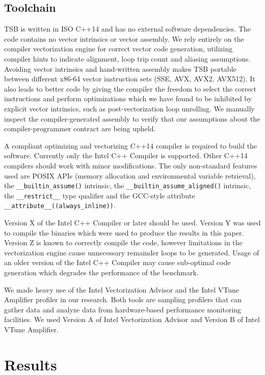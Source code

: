 \documentclass[conference]{IEEEtran}
\begin{document}
\subsection{Toolchain}

TSB is written in ISO C++14 and has no external software dependencies. The code
contains no vector intrinsics or vector assembly. We rely entirely on the
compiler vectorization engine for correct vector code generation, utilizing
compiler hints to indicate alignment, loop trip count and aliasing assumptions.
Avoiding vector intrinsics and hand-written assembly makes TSB portable between
different x86-64 vector instruction sets (SSE, AVX, AVX2, AVX512). It also
leads to better code by giving the compiler the freedom to select the correct
instructions and perform optimizations which we have found to be inhibited by
explicit vector intrinsics, such as post-vectorization loop unrolling. We
manually inspect the compiler-generated assembly to verify that our assumptions
about the compiler-programmer contract are being upheld.

A compliant optimizing and vectorizing C++14 compiler is required to build the
software. Currently only the Intel C++ Compiler is supported. Other C++14
compilers should work with minor modifications. The only non-standard features
used are POSIX APIs (memory allocation and environmental variable retrieval),
the \lstinline{__builtin_assume()} intrinsic, the
\lstinline{__builtin_assume_aligned()} intrinsic, the \lstinline{__restrict__}
type qualifier and the GCC-style attribute
\lstinline{__attribute__((always_inline))}. 

Version X of the Intel C++ Compiler or later should be used. Version Y was used
to compile the binaries which were used to produce the results in this paper.
Version Z is known to correctly compile the code, however limitations in the
vectorization engine cause unnecessary remainder loops to be generated. Usage
of an older version of the Intel C++ Compiler may cause sub-optimal code
generation which degrades the performance of the benchmark.

We made heavy use of the Intel Vectorization Advisor and the Intel VTune
Amplifier profiler in our research. Both tools are sampling profilers that can
gather data and analyze data from hardware-based performance monitoring
facilities. We used Version A of Intel Vectorization Advisor and Version B of
Intel VTune Amplifier.

\section{Results}
\end{document}
